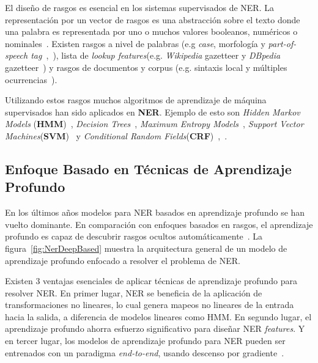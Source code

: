 El dise\~no de rasgos es esencial en los sistemas supervisados de NER. La representaci\'on por un vector de rasgos es una abstracci\'on sobre el texto donde una palabra es representada por uno o muchos valores booleanos, num\'ericos o nominales~\cite{sekine2009named}. Existen rasgos a nivel de palabras (e.g \emph{case}, morfolog\'ia y \emph{part-of-speech tag}~\cite{settles2004biomedical},~\cite{liao2009simple}), lista de \emph{lookup features}(e.g. \emph{Wikipedia} gazetteer y \emph{DBpedia} gazetteer~\cite{hoffart2011robust}) y rasgos de documentos y corpus (e.g. sintaxis local y m\'ultiples ocurrencias~\cite{ji2016joint}).

Utilizando estos rasgos muchos algoritmos de aprendizaje de m\'aquina supervisados han sido aplicados en \textbf{NER}. Ejemplo de esto son \emph{Hidden Markov Models} (\textbf{HMM})~\cite{bikel1999algorithm}, \emph{Decision Trees}~\cite{szarvas2006multilingual}, \emph{Maximum Entropy Models}~\cite{bender2003maximum}, \emph{Support Vector Machines}(\textbf{SVM})~\cite{li2004svm} y \emph{Conditional Random Fields}(\textbf{CRF})~\cite{settles2004biomedical},~\cite{lafferty2001conditional}.

\subsection{Enfoque Basado en T\'ecnicas de Aprendizaje Profundo}
En los \'ultimos a\~nos modelos para NER basados en aprendizaje profundo se han vuelto dominante. En comparaci\'on con enfoques basados en rasgos, el aprendizaje profundo es capaz de descubrir rasgos ocultos autom\'aticamente~\cite{li2018survey}. La figura~\ref{fig:NerDeepBased} muestra la arquitectura general de un modelo de aprendizaje profundo enfocado a resolver el problema de NER. 

Existen 3 ventajas esenciales de aplicar t\'ecnicas de aprendizaje profundo para resolver NER. En primer lugar, NER se beneficia de la aplicaci\'on de transformaciones no lineares, lo cual genera mapeos no lineares de la entrada hacia la salida, a diferencia de modelos lineares como HMM. En segundo lugar, el aprendizaje profundo ahorra esfuerzo significativo para dise\~nar NER \emph{features}. Y en tercer lugar, los modelos de aprendizaje profundo para NER pueden ser entrenados con un paradigma \emph{end-to-end}, usando descenso por gradiente~\cite{li2018survey}.

